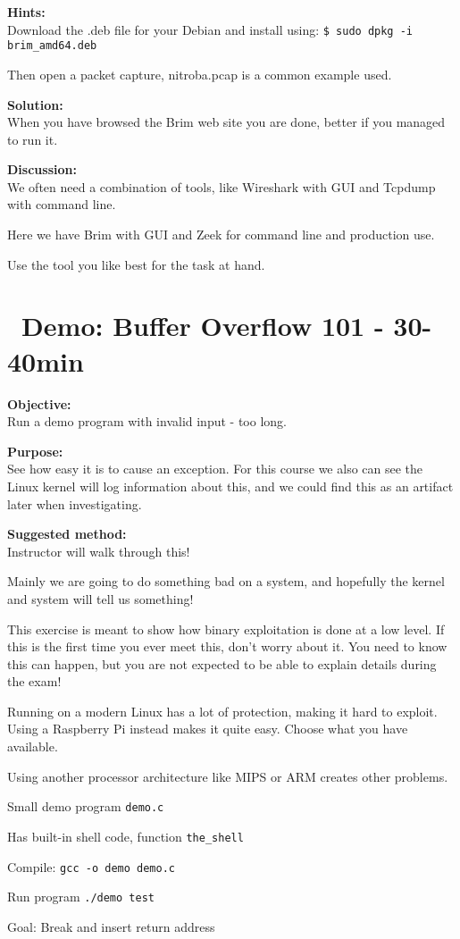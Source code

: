 \documentclass[a4paper,11pt,notitlepage]{report}
\begin{document}
{\bf Hints:}\\
Download the .deb file for your Debian and install using:
\verb+$ sudo dpkg -i brim_amd64.deb+

Then open a packet capture, nitroba.pcap is a common example used.

{\bf Solution:}\\
When you have browsed the Brim web site you are done, better if you managed to run it.

{\bf Discussion:}\\
We often need a combination of tools, like Wireshark with GUI and Tcpdump with command line.

Here we have Brim with GUI and Zeek for command line and production use.

Use the tool you like best for the task at hand.



\chapter{\faInfoCircle\ Demo: Buffer Overflow 101 - 30-40min}
\label{ex:bufferoverflow}


{\bf Objective:}\\
Run a demo program with invalid input - too long.

{\bf Purpose:}\\
See how easy it is to cause an exception. For this course we also can see the Linux kernel will log information about this, and we could find this as an artifact later when investigating.

{\bf Suggested method:}\\
Instructor will walk through this!

{\Large
Mainly we are going to do something bad on a system, and hopefully the kernel and system will tell us something!

This exercise is meant to show how binary exploitation is done at a low level. If this is the first time you ever meet this, don't worry about it. You need to know this can happen, but you are not expected to be able to explain details during the exam!}

Running on a modern Linux has a lot of protection, making it hard to exploit. Using a Raspberry Pi instead makes it quite easy. Choose what you have available.

Using another processor architecture like MIPS or ARM creates other problems.

\begin{list2}
\item Small demo program \verb+demo.c+
\item Has built-in shell code, function \verb+the_shell+
\item Compile:
\verb+gcc -o demo demo.c+
\item Run program
\verb+./demo test+
\item Goal: Break and insert return address
\end{list2}
\end{document}
